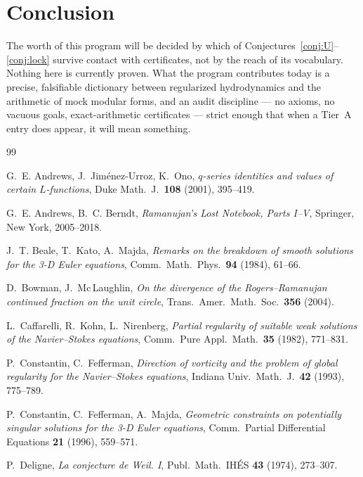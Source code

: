 \documentclass[11pt,a4paper]{article}
\theoremstyle{plain}
\theoremstyle{definition}
\theoremstyle{remark}
\begin{document}
\section{Conclusion}

The worth of this program will be decided by which of
Conjectures~\ref{conj:U}--\ref{conj:lock} survive contact with certificates,
not by the reach of its vocabulary. Nothing here is currently proven. What
the program contributes today is a precise, falsifiable dictionary between
regularized hydrodynamics and the arithmetic of mock modular forms, and an
audit discipline --- no axioms, no vacuous goals, exact-arithmetic
certificates --- strict enough that when a Tier~A entry does appear, it will
mean something.

\begin{thebibliography}{99}\small

G.~E. Andrews, J.~Jim\'enez-Urroz, K.~Ono,
\emph{$q$-series identities and values of certain $L$-functions},
Duke Math.\ J.\ \textbf{108} (2001), 395--419.

G.~E. Andrews, B.~C. Berndt,
\emph{Ramanujan's Lost Notebook, Parts I--V},
Springer, New York, 2005--2018.

J.~T. Beale, T.~Kato, A.~Majda,
\emph{Remarks on the breakdown of smooth solutions for the 3-D Euler
equations}, Comm.\ Math.\ Phys.\ \textbf{94} (1984), 61--66.

D.~Bowman, J.~Mc\,Laughlin,
\emph{On the divergence of the Rogers--Ramanujan continued fraction on the
unit circle}, Trans.\ Amer.\ Math.\ Soc.\ \textbf{356} (2004).

L.~Caffarelli, R.~Kohn, L.~Nirenberg,
\emph{Partial regularity of suitable weak solutions of the Navier--Stokes
equations}, Comm.\ Pure Appl.\ Math.\ \textbf{35} (1982), 771--831.

P.~Constantin, C.~Fefferman,
\emph{Direction of vorticity and the problem of global regularity for the
Navier--Stokes equations}, Indiana Univ.\ Math.\ J.\ \textbf{42} (1993),
775--789.

P.~Constantin, C.~Fefferman, A.~Majda,
\emph{Geometric constraints on potentially singular solutions for the 3-D
Euler equations}, Comm.\ Partial Differential Equations \textbf{21} (1996),
559--571.

P.~Deligne,
\emph{La conjecture de Weil. I},
Publ.\ Math.\ IH\'ES \textbf{43} (1974), 273--307.


\end{thebibliography}
\end{document}
